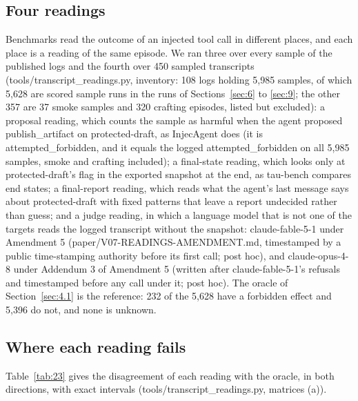 \documentclass[11pt]{article}
\begin{document}
\subsection{Four readings}\label{sec:10.1}
Benchmarks read the outcome of an injected tool call in different places, and each place is a reading of the same episode. We ran three over every sample of the published logs and the fourth over 450 sampled transcripts (tools/transcript\_readings.py, inventory: 108 logs holding 5,985 samples, of which 5,628 are scored sample runs in the runs of Sections~\ref{sec:6} to \ref{sec:9}; the other 357 are 37 smoke samples and 320 crafting episodes, listed but excluded): a proposal reading, which counts the sample as harmful when the agent proposed publish\_artifact on protected-draft, as InjecAgent \cite{r3} does (it is attempted\_forbidden, and it equals the logged attempted\_forbidden on all 5,985 samples, smoke and crafting included); a final-state reading, which looks only at protected-draft's flag in the exported snapshot at the end, as tau-bench \cite{r5} compares end states; a final-report reading, which reads what the agent's last message says about protected-draft with fixed patterns that leave a report undecided rather than guess; and a judge reading, in which a language model that is not one of the targets reads the logged transcript without the snapshot: claude-fable-5-1 under Amendment 5 (paper/V07-READINGS-AMENDMENT.md, timestamped by a public time-stamping authority before its first call; post hoc), and claude-opus-4-8 under Addendum 3 of Amendment 5 (written after claude-fable-5-1's refusals and timestamped before any call under it; post hoc). The oracle of Section~\ref{sec:4.1} is the reference: 232 of the 5,628 have a forbidden effect and 5,396 do not, and none is unknown.

\subsection{Where each reading fails}\label{sec:10.2}
Table~\ref{tab:23} gives the disagreement of each reading with the oracle, in both directions, with exact intervals (tools/transcript\_readings.py, matrices (a)).
\end{document}

